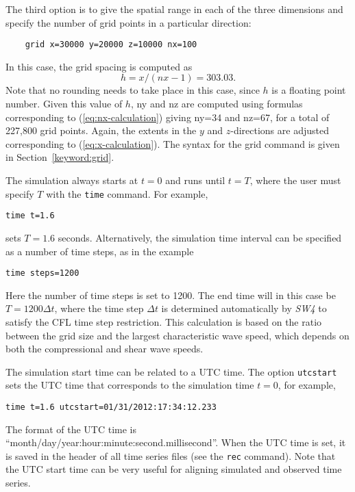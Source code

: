 \documentclass[11pt]{report}
\begin{document}
The third option is to give the spatial range in each of the three dimensions and specify the number
of grid points in a particular direction:
%
\begin{verbatim}
	grid x=30000 y=20000 z=10000 nx=100
\end{verbatim}
%
In this case, the grid spacing is computed as 
\[
h = x/(nx-1)= 303.03.
\]
Note that no rounding needs to take place in this case, since $h$ is a floating point number. Given this
value of $h$, ny and nz are computed using formulas corresponding to
(\ref{eq:nx-calculation}) giving ny=34 and nz=67, for a total of 227,800 grid points. Again,
the extents in the $y$ and $z$-directions are adjusted corresponding to (\ref{eq:x-calculation}). The syntax
for the grid command is given in Section~\ref{keyword:grid}.

The simulation always starts at $t=0$ and runs until $t=T$, where the user must specify $T$ with the
{\tt time} command. For example,
\begin{verbatim}
time t=1.6
\end{verbatim}
sets $T=1.6$ seconds. Alternatively, the simulation time interval can be specified as 
a number of time steps, as in the example
\begin{verbatim}
time steps=1200
\end{verbatim}
Here the number of time steps is set to 1200. The end time will in this case be $T=1200\Delta t$,
where the time step $\Delta t$ is determined automatically by \emph{SW4} to satisfy the CFL time
step restriction. This calculation is based on the ratio between the grid size and the largest
characteristic wave speed, which depends on both the compressional and shear wave speeds. 

The simulation start time can be related to a UTC time. The option {\tt utcstart} sets the UTC time
that corresponds to the simulation time $t=0$, for example,
\begin{verbatim}
time t=1.6 utcstart=01/31/2012:17:34:12.233
\end{verbatim}
The format of the UTC time is ``month/day/year:hour:minute:second.millisecond''. When the UTC time
is set, it is saved in the header of all time series files (see the {\tt rec} command). Note that
the UTC start time can be very useful for aligning simulated and observed time series.
\end{document}
